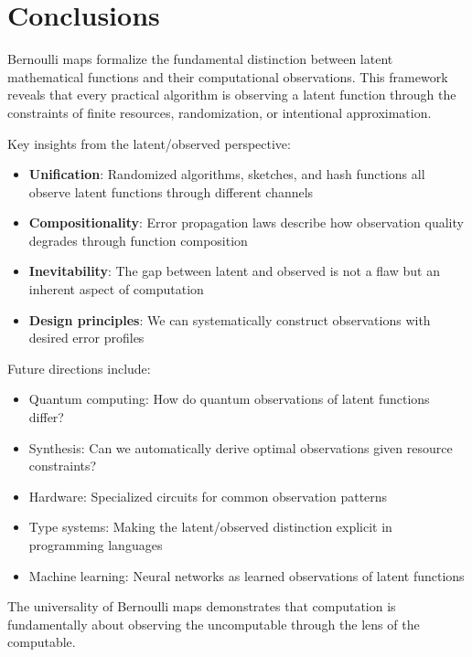 \documentclass[11pt,final,hidelinks]{article}
\begin{document}
\section{Conclusions}

Bernoulli maps formalize the fundamental distinction between latent mathematical functions and their computational observations. This framework reveals that every practical algorithm is observing a latent function through the constraints of finite resources, randomization, or intentional approximation.

Key insights from the latent/observed perspective:
\begin{itemize}
    \item \textbf{Unification}: Randomized algorithms, sketches, and hash functions all observe latent functions through different channels
    \item \textbf{Compositionality}: Error propagation laws describe how observation quality degrades through function composition
    \item \textbf{Inevitability}: The gap between latent and observed is not a flaw but an inherent aspect of computation
    \item \textbf{Design principles}: We can systematically construct observations with desired error profiles
\end{itemize}

Future directions include:
\begin{itemize}
    \item Quantum computing: How do quantum observations of latent functions differ?
    \item Synthesis: Can we automatically derive optimal observations given resource constraints?
    \item Hardware: Specialized circuits for common observation patterns
    \item Type systems: Making the latent/observed distinction explicit in programming languages
    \item Machine learning: Neural networks as learned observations of latent functions
\end{itemize}

The universality of Bernoulli maps demonstrates that computation is fundamentally about observing the uncomputable through the lens of the computable.


\end{document}
